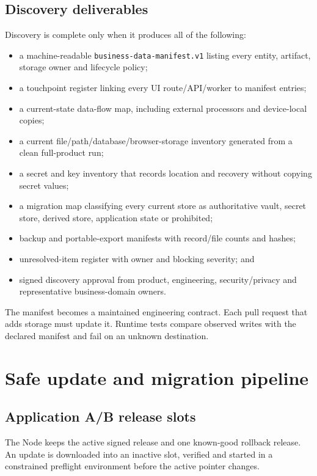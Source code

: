 \documentclass[11pt]{article}
\newcommand{\code}[1]{\texttt{#1}}
\begin{document}
\subsection{Discovery deliverables}

Discovery is complete only when it produces all of the following:

\begin{itemize}
  \item a machine-readable \code{business-data-manifest.v1} listing every entity, artifact, storage owner and lifecycle policy;
  \item a touchpoint register linking every UI route/API/worker to manifest entries;
  \item a current-state data-flow map, including external processors and device-local copies;
  \item a current file/path/database/browser-storage inventory generated from a clean full-product run;
  \item a secret and key inventory that records location and recovery without copying secret values;
  \item a migration map classifying every current store as authoritative vault, secret store, derived store, application state or prohibited;
  \item backup and portable-export manifests with record/file counts and hashes;
  \item unresolved-item register with owner and blocking severity; and
  \item signed discovery approval from product, engineering, security/privacy and representative business-domain owners.
\end{itemize}

The manifest becomes a maintained engineering contract. Each pull request that adds storage must update it. Runtime tests compare observed writes with the declared manifest and fail on an unknown destination.

\section{Safe update and migration pipeline}

\subsection{Application A/B release slots}

The Node keeps the active signed release and one known-good rollback release. An update is downloaded into an inactive slot, verified and started in a constrained preflight environment before the active pointer changes.
\end{document}
